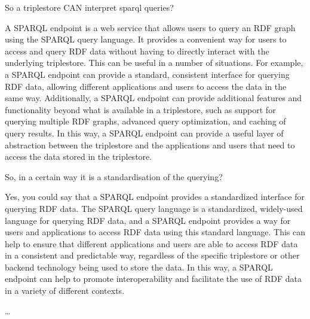 \begin{description}
	\me So a triplestore CAN interpret sparql queries?
	
	\gpt A SPARQL endpoint is a web service that allows users to query an RDF graph using the SPARQL query language. It provides a convenient way for users to access and query RDF data without having to directly interact with the underlying triplestore. This can be useful in a number of situations. For example, a SPARQL endpoint can provide a standard, consistent interface for querying RDF data, allowing different applications and users to access the data in the same way. Additionally, a SPARQL endpoint can provide additional features and functionality beyond what is available in a triplestore, such as support for querying multiple RDF graphs, advanced query optimization, and caching of query results. In this way, a SPARQL endpoint can provide a useful layer of abstraction between the triplestore and the applications and users that need to access the data stored in the triplestore.
	
	\me So, in a certain way it is a standardisation of the querying?
	
	\gpt Yes, you could say that a SPARQL endpoint provides a standardized interface for querying RDF data. The SPARQL query language is a standardized, widely-used language for querying RDF data, and a SPARQL endpoint provides a way for users and applications to access RDF data using this standard language. This can help to ensure that different applications and users are able to access RDF data in a consistent and predictable way, regardless of the specific triplestore or other backend technology being used to store the data. In this way, a SPARQL endpoint can help to promote interoperability and facilitate the use of RDF data in a variety of different contexts.

	\dots
\end{description}